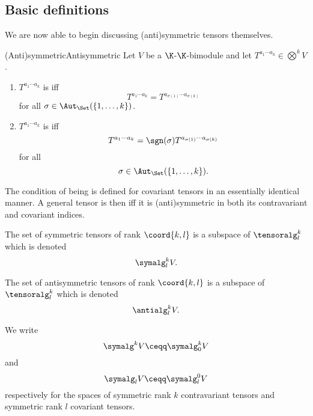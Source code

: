 \subsection{Basic definitions}

We are now able to begin discussing (anti)symmetric tensors themselves.
\begin{dfn}{(Anti)symmetric}{Antisymmetric}
	Let $V$ be a $\K$-$\K$-bimodule and let $T^{a_1\cdots a_k}\in \bigotimes ^kV$.
	\begin{enumerate}
		\item $T^{a_1\cdots a_k}$ is  iff
		\begin{equation}
			T^{a_1\cdots a_k}=T^{a_{\sigma (1)}\cdots a_{\sigma (k)}}
		\end{equation}
		for all $\sigma \in \Aut _{\Set}(\{ 1,\ldots ,k\} )$.
		\item $T^{a_1\cdots a_k}$ is  iff
		\begin{equation}
			T^{a_1\cdots a_k}=\sgn (\sigma )T^{a_{\sigma (1)}\cdots a_{\sigma (k)}}
		\end{equation}
		for all
		\begin{equation}
			\sigma \in \Aut _{\Set}(\{ 1,\ldots ,k\}).
		\end{equation}
	\end{enumerate}
	\begin{rmk}
		The condition of being  is defined for covariant tensors in an essentially identical manner.  A general tensor is then  iff it is (anti)symmetric in both its contravariant and covariant indices.
	\end{rmk}
	\begin{rmk}
		The set of symmetric tensors of rank $\coord{k,l}$ is a subspace of $\tensoralg _l^k$ which is denoted
		\begin{equation}
			\symalg _l^kV.
		\end{equation}\index[notation]{$\symalg _l^kV$}
		
		The set of antisymmetric tensors of rank $\coord{k,l}$ is a subspace of $\tensoralg _l^k$ which is denoted
		\begin{equation}
		\antialg _l^kV.
		\end{equation}\index[notation]{$\antialg _l^kV$}
	\end{rmk}
	\begin{rmk}
		We write
		\begin{equation}
			\symalg ^kV\ceqq \symalg _0^kV
		\end{equation}\index[notation]{$\symalg ^kV$}
		and
		\begin{equation}
			\symalg _lV\ceqq \symalg _l^0V
		\end{equation}\index[notation]{$\symalg _lV$}
		respectively for the spaces of symmetric rank $k$ contravariant tensors and symmetric rank $l$ covariant tensors.
		

\end{rmk}
\end{dfn}
